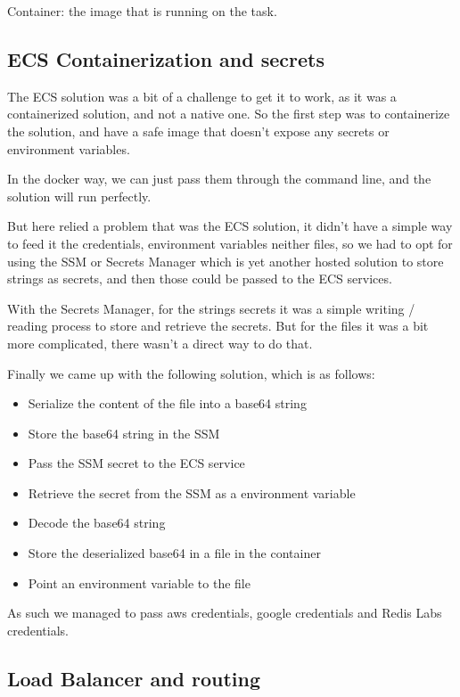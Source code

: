 Container: the image that is running on the task.

\subsection {ECS Containerization and secrets}

The ECS solution was a bit of a challenge to get it to work,
as it was a containerized solution, and not a native one.
So the first step was to containerize the solution, and have a safe image 
that doesn't expose any secrets or environment variables.

In the docker way, we can just pass them through the command line,
and the solution will run perfectly.

But here relied a problem that was the ECS solution, it didn't have a simple
way to feed it the credentials, environment variables neither files, so we had to opt
for using the SSM or Secrets Manager
which is yet another hosted solution to store strings as secrets, and then those could be 
passed to the ECS services.

With the Secrets Manager, for the strings secrets it was a simple writing / reading process
to store and retrieve the secrets. But for the files it was a bit more complicated, there
wasn't a direct way to do that.

Finally we came up with the following solution, which is as follows:

\begin{itemize}
    \item Serialize the content of the file into a base64 string
    \item Store the base64 string in the SSM
    \item Pass the SSM secret to the ECS service
    \item Retrieve the secret from the SSM as a environment variable
    \item Decode the base64 string
    \item Store the deserialized base64 in a file in the container
    \item Point an environment variable to the file
\end{itemize}

As such we managed to pass aws credentials, google credentials and Redis Labs credentials.

\subsection {Load Balancer and routing}

